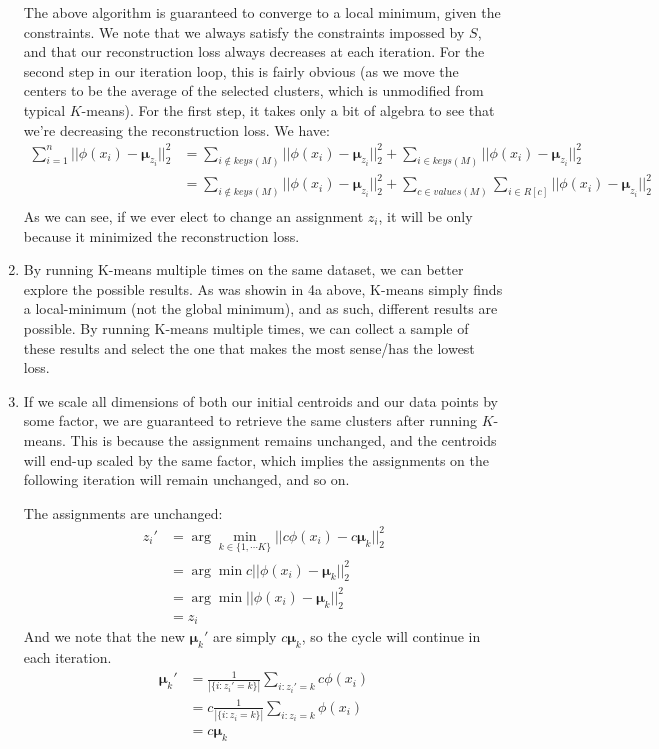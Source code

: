\documentclass[12pt]{article}
\begin{document}
\begin{enumerate}[label=(\alph*)]
      The above algorithm is guaranteed to converge to a local minimum, given the constraints. We note that we always satisfy the constraints impossed by $S$, and that our reconstruction loss always decreases at each iteration. For the second step in our iteration loop, this is fairly obvious (as we move the centers to be the average of the selected clusters, which is unmodified from typical $K$-means). For the first step, it takes only a bit of algebra to see that we're decreasing the reconstruction loss. We have:
      \begin{align*}
        \sum_{i=1}^n ||\phi(x_i) - \bm{\mu}_{z_i} ||_2^2 &= \sum_{i \notin keys(M)} || \phi(x_i) - \bm{\mu}_{z_i} ||_2^2 + \sum_{i \in keys(M)} ||\phi(x_i) - \bm{\mu}_{z_i} ||_2^2 \\
        &= \sum_{i \notin keys(M)} || \phi(x_i) - \bm{\mu}_{z_i} ||_2^2  + \sum_{c \in values(M)} \sum_{i \in R[c]} ||\phi(x_i) - \bm{\mu}_{z_i} ||_2^2 \\
      \end{align*}
      As we can see, if we ever elect to change an assignment $z_i$, it will be only because it minimized the reconstruction loss.

    \item By running K-means multiple times on the same dataset, we can better explore the possible results. As was showin in 4a above, K-means simply finds a local-minimum (not the global minimum), and as such, different results are possible. By running K-means multiple times, we can collect a sample of these results and select the one that makes the most sense/has the lowest loss.

    \item If we scale all dimensions of both our initial centroids and our data points by some factor, we are guaranteed to retrieve the same clusters after running $K$-means. This is because the assignment remains unchanged, and the centroids will end-up scaled by the same factor, which implies the assignments on the following iteration will remain unchanged, and so on.

    The assignments are unchanged:
    \begin{align*}
      z_i' &= \arg\min_{k \in \{1, \cdots K\}} || c\phi(x_i) - c\bm{\mu}_k ||_2^2 \\
      &= \arg\min c ||\phi(x_i) - \bm{\mu}_k ||_2^2 \tag{properties of distance metric} \\
      &= \arg\min ||\phi(x_i) - \bm{\mu}_k ||_2^2 \tag{definition of $\arg\min$} \\
      &= z_i
    \end{align*}
    And we note that the new $\bm{\mu}_k'$ are simply $c\bm{\mu}_k$, so the cycle will continue in each iteration.
    \begin{align*}
      \bm{\mu}_k' &= \frac{1}{|\{ i : z_i' = k\}|}\sum_{i:z_i' = k}c \phi(x_i) \\
      &= c \frac{1}{|\{ i : z_i = k\}|}\sum_{i:z_i = k}\phi(x_i)\tag{assignment unchanged, properties of sum} \\
      &= c\bm{\mu}_k
    \end{align*}


\end{enumerate}
\end{document}

